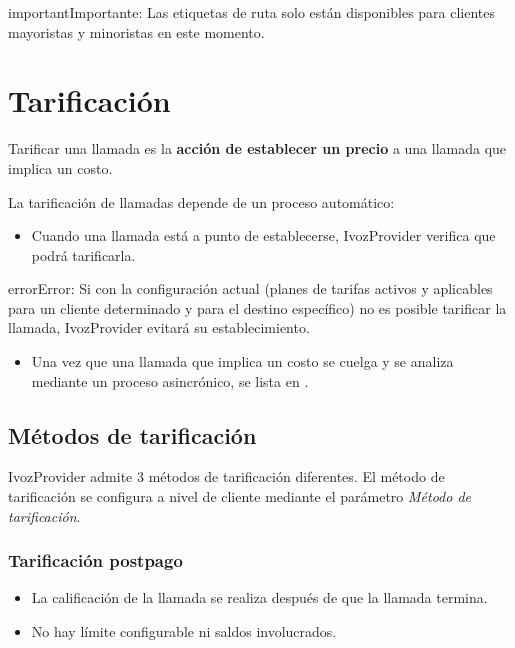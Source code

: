 \documentclass[letterpaper,10pt,spanish]{sphinxmanual}
\begin{document}
\begin{notice}{important}{Importante:}
Las etiquetas de ruta solo están disponibles para clientes mayoristas y minoristas en este momento.
\end{notice}


\section{Tarificación}
\label{administration_portal/brand/billing/index::doc}\label{administration_portal/brand/billing/index:billing}\label{administration_portal/brand/billing/index:id1}
Tarificar una llamada es la \textbf{acción de establecer un precio} a una llamada que implica un costo.

La tarificación de llamadas depende de un proceso automático:
\begin{itemize}
\item {} 
Cuando una llamada está a punto de establecerse, IvozProvider verifica que podrá tarificarla.

\end{itemize}

\begin{notice}{error}{Error:}
Si con la configuración actual (planes de tarifas activos y aplicables para un cliente determinado y para el destino específico) no es posible tarificar la llamada, IvozProvider evitará su establecimiento.
\end{notice}
\begin{itemize}
\item {} 
Una vez que una llamada que implica un costo se cuelga y se analiza mediante un proceso asincrónico, se lista en {\hyperref[administration_portal/platform/external_calls:id1]{}}.

\end{itemize}


\subsection{Métodos de tarificación}
\label{administration_portal/brand/billing/index:billing-methods}
IvozProvider admite 3 métodos de tarificación diferentes. El método de tarificación se configura a nivel de cliente mediante el parámetro \emph{Método de tarificación}.


\subsubsection{Tarificación postpago}
\label{administration_portal/brand/billing/index:postpaid-billing}\label{administration_portal/brand/billing/index:id2}\begin{itemize}
\item {} 
La calificación de la llamada se realiza después de que la llamada termina.

\item {} 
No hay límite configurable ni saldos involucrados.

\end{itemize}
\end{document}
